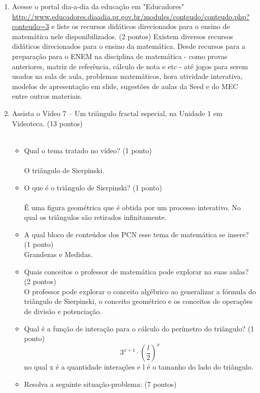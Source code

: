 \documentclass[a4paper, 12pt]{article}
\begin{document}
\begin{enumerate}
\begin{enumerate}
    \item Acesse o portal dia-a-dia da educação  em  "Educadores"
      \url{http://www.educadores.diaadia.pr.gov.br/modules/conteudo/conteudo.php?conteudo=3}
      e liste os recursos didáticos direcionados para o ensino de matemática nele disponibilizados. (2 pontos)
      Existem diversos recursos didáticos direcionados para o ensino da matemática. Desde recursos para a preparação para o ENEM na disciplina de matemática - como provas anteriores, matriz de referência, cálculo de nota e etc - até jogos para serem usados na sala de aula, problemas matemáticos, hora atividade interativa, modelos de apresentação em slide, sugestões de aulas da Seed e do MEC entre outros materiais.
    \item Assista o Vídeo 7 – Um triângulo fractal especial, na Unidade 1 em Videoteca. (13 pontos) \\ \\
      \begin{itemize}
      \item Qual o tema tratado no vídeo? (1 ponto) \\ \\
        O triângulo de Sierpinski. \\
      \item O que é o triângulo de Sierpinski? (1 ponto) \\ \\
        É uma figura geométrica que é obtida por um processo interativo. No qual os triângulos são retirados infinitamente. \\
      \item A qual bloco de conteúdos dos PCN esse tema de matemática se insere? (1 ponto) \\
        Grandezas e Medidas.
      \item Quais conceitos o professor de matemática pode explorar na suas aulas? (2 pontos) \\
        O professor pode explorar o conceito algébrico ao generalizar a fórmula do triângulo de Sierpinski, o conceito geométrico e os conceitos de operações de divisão e potenciação. \\
      \item Qual é a função de interação para o cálculo do perímetro do triângulo? (1 ponto)
        $$3^{x+1}\cdot\left(\frac{l}{2}\right)^{x}$$ no qual x é a quantidade interações e l é o tamanho do lado do triângulo.
      \item Resolva a seguinte situação-problema: (7 pontos) \\ \\

\end{itemize}
\end{enumerate}
\end{enumerate}
\end{document}
